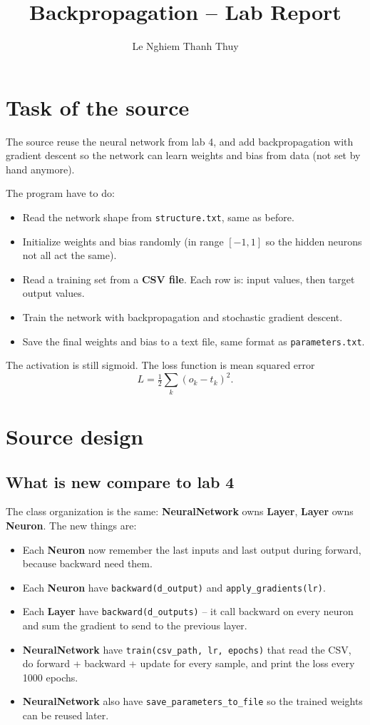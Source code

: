 \documentclass[12pt,a4paper]{article}
\title{Backpropagation -- Lab Report}
\author{Le Nghiem Thanh Thuy}
\date{}
\begin{document}
\maketitle

\section{Task of the source}

The source reuse the neural network from lab 4, and add backpropagation with gradient descent so the network can learn weights and bias from data (not set by hand anymore).

The program have to do:
\begin{itemize}
    \item Read the network shape from \texttt{structure.txt}, same as before.
    \item Initialize weights and bias randomly (in range $[-1, 1]$ so the hidden neurons not all act the same).
    \item Read a training set from a \textbf{CSV file}. Each row is: input values, then target output values.
    \item Train the network with backpropagation and stochastic gradient descent.
    \item Save the final weights and bias to a text file, same format as \texttt{parameters.txt}.
\end{itemize}

The activation is still sigmoid. The loss function is mean squared error
\[
L = \tfrac{1}{2} \sum_{k} (o_k - t_k)^2.
\]

\section{Source design}

\subsection{What is new compare to lab 4}

The class organization is the same: \textbf{NeuralNetwork} owns \textbf{Layer}, \textbf{Layer} owns \textbf{Neuron}. The new things are:

\begin{itemize}
    \item Each \textbf{Neuron} now remember the last inputs and last output during forward, because backward need them.
    \item Each \textbf{Neuron} have \texttt{backward(d\_output)} and \texttt{apply\_gradients(lr)}.
    \item Each \textbf{Layer} have \texttt{backward(d\_outputs)} -- it call backward on every neuron and sum the gradient to send to the previous layer.
    \item \textbf{NeuralNetwork} have \texttt{train(csv\_path, lr, epochs)} that read the CSV, do forward + backward + update for every sample, and print the loss every 1000 epochs.
    \item \textbf{NeuralNetwork} also have \texttt{save\_parameters\_to\_file} so the trained weights can be reused later.
\end{itemize}
\end{document}
